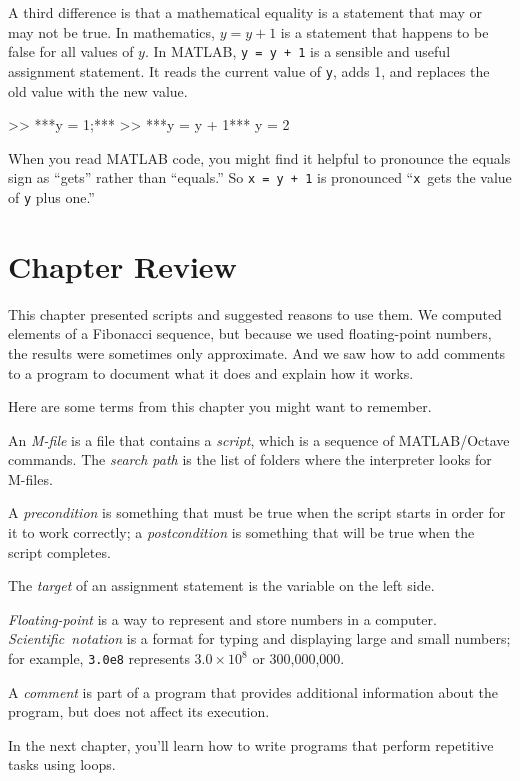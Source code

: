 A third difference is that a mathematical equality is a statement that
may or may not be true.  In mathematics, $y = y+1$ is a statement that
happens to be false for all values of $y$.  
In MATLAB, \lstinline{y = y + 1} is a sensible and useful assignment statement.
It reads the current value of \lstinline{y}, adds 1, and replaces the old value with the new value.

\begin{code}
>> ***y = 1;***
>> ***y = y + 1***
y = 2
\end{code}

When you read MATLAB code, you might find it helpful to pronounce
the equals sign as ``gets'' rather than ``equals.''  So \lstinline{x = y + 1}
is pronounced ``\lstinline{x}~gets the value of \lstinline{y} plus one.''

\section{Chapter Review}

This chapter presented scripts and suggested reasons to use them.  We computed elements of a Fibonacci sequence, but because we used floating-point numbers, the results were sometimes only approximate.
And we saw how to add comments to a program to document what it does and explain how it works.

Here are some terms from this chapter you might want to remember.

An \emph{M-file} is a file that contains a \emph{script}, which is a sequence of MATLAB/Octave commands.
The \emph{search path} is the list of folders where the interpreter looks for
M-files.

A \emph{precondition} is something that must be true when the script
starts in order for it to work correctly; a \emph{postcondition} is something that will be true when the script completes.

The \emph{target} of an assignment statement is the variable on the left side.

\emph{Floating-point} is a way to represent and store numbers in a computer.
\mbox{\emph{Scientific notation}} is a format for typing and displaying large
and small numbers; for example, \lstinline{3.0e8} represents $3.0 \times 10^8$
or 300,000,000.

A \emph{comment} is part of a program that provides additional information
about the program, but does not affect its execution.

In the next chapter, you'll learn how to write programs that perform repetitive tasks using loops.


